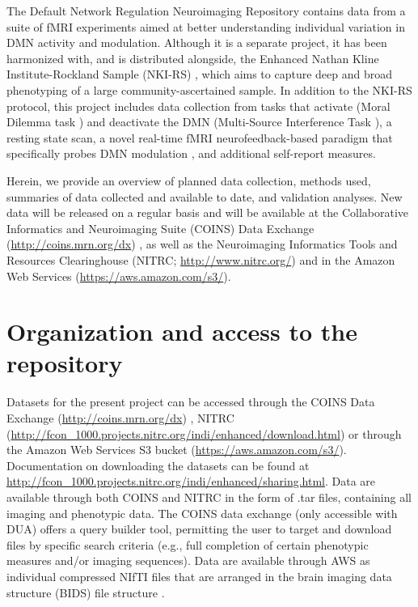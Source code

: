 The Default Network Regulation Neuroimaging Repository contains data from a suite of fMRI experiments aimed at better understanding individual variation in DMN activity and modulation. Although it is a separate project, it has been harmonized with, and is distributed alongside, the Enhanced Nathan Kline Institute-Rockland Sample (NKI-RS) \cite{Nooner2012}, which aims to capture deep and broad phenotyping of a large community-ascertained sample. In addition to the NKI-RS protocol, this project includes data collection from tasks that activate (Moral Dilemma task \cite{Harrison2008}) and deactivate the DMN (Multi-Source Interference Task \cite{Bush2006}), a resting state scan, a novel real-time fMRI neurofeedback-based paradigm that specifically probes DMN modulation \cite{Craddock2012}, and additional self-report measures.

Herein, we provide an overview of planned data collection, methods used, summaries of data collected and available to date, and validation analyses. New data will be released on a regular basis and will be available at the Collaborative Informatics and Neuroimaging Suite (COINS) Data Exchange (\url{http://coins.mrn.org/dx}) \cite{Scott2011,Wood2014}, as well as the Neuroimaging Informatics Tools and Resources Clearinghouse (NITRC; \url{http://www.nitrc.org/}) and in the Amazon Web Services (\url{https://aws.amazon.com/s3/}).

\section{Organization and access to the repository}

Datasets for the present project can be accessed through the COINS Data Exchange (\url{http://coins.mrn.org/dx}) \cite{Scott2011,Wood2014}, NITRC (\url{http://fcon\_1000.projects.nitrc.org/indi/enhanced/download.html}) or through the Amazon Web Services S3 bucket (\url{https://aws.amazon.com/s3/}). Documentation on downloading the datasets can be found at \url{http://fcon\_1000.projects.nitrc.org/indi/enhanced/sharing.html}. Data are available through both COINS and NITRC in the form of .tar files, containing all imaging and phenotypic data. The COINS data exchange (only accessible with DUA) offers a query builder tool, permitting the user to target and download files by specific search criteria (e.g., full completion of certain phenotypic measures and/or imaging sequences). Data are available through AWS as individual compressed NIfTI files that are arranged in the brain imaging data structure (BIDS) file structure \cite{Gorgolewski2016}.

